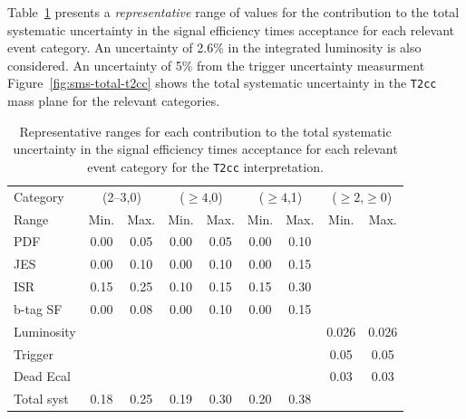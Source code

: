 Table~\ref{tab:sms-syst-t2cc} presents a {\it representative} range of
values for the contribution to the total systematic uncertainty in the
signal efficiency times acceptance for each relevant event
category. An uncertainty of 2.6\% in the integrated luminosity is also
considered. An uncertainty of 5\% from the trigger uncertainty measurment
Figure~\ref{fig:sms-total-t2cc} shows the total systematic uncertainty 
in the \verb!T2cc! mass plane for the relevant categories.

\begin{table}[h!]
  \caption{Representative ranges for each contribution to the total
    systematic uncertainty in the signal efficiency times acceptance
    for each relevant event category for the \texttt{T2cc}
    interpretation.
    \label{tab:sms-syst-t2cc}
  }   
  \centering
  \begin{tabular}{ lcccccccc }
    \hline
    \hline
    Category   & \multicolumn{2}{c}{(2--3,0)} & \multicolumn{2}{c}{($\geq 4$,0)} & \multicolumn{2}{c}{($\geq 4$,1)} & \multicolumn{2}{c}{($\geq 2$,$\geq 0$)} \\
    Range      & Min.   & Max.                & Min.   & Max.                    & Min. & Max.                      & Min.  & Max.        \\
    \hline
    PDF        & 0.00   & 0.05                & 0.00   & 0.05                    & 0.00 & 0.10                      &         \\
    JES        & 0.00   & 0.10                & 0.00   & 0.10                    & 0.00 & 0.15 	                    &             \\
    ISR        & 0.15   & 0.25                & 0.10   & 0.15                    & 0.15 & 0.30 	                    &             \\
    b-tag SF   & 0.00   & 0.08                & 0.00   & 0.10                    & 0.00 & 0.15 	                    &             \\
    Luminosity &        &                     &        &                         &      &      	                    & 0.026 & 0.026        \\
    Trigger    &        &                     &        &                         &      &                           & 0.05 & 0.05        \\
    Dead Ecal  &        &                     &        &                         &      &      	                    & 0.03 & 0.03        \\
    \hline
    Total syst & 0.18   & 0.25                & 0.19   & 0.30                    & 0.20 & 0.38                      &      &             \\
    \hline
    \hline
  \end{tabular}
\end{table}


